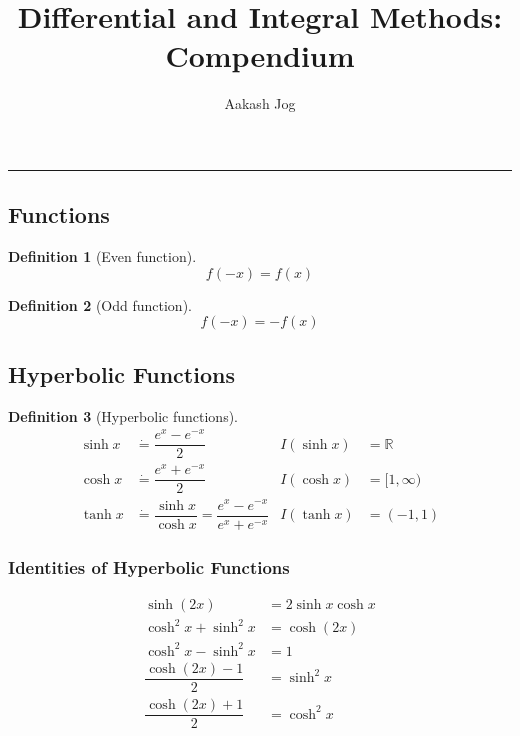 \documentclass[fleqn, a4paper, 10pt]{article}
\title{Differential and Integral Methods: Compendium}
\author{Aakash Jog}
\theoremstyle{definition}
\newtheorem{definition}{Definition}
\theoremstyle{theorem}
\theoremstyle{remark}
\begin{document}
	
\maketitle
\setlength{\mathindent}{0pt}

\tableofcontents

\vspace{1cm}
\hrule
\vspace{1cm}

\begin{multicols}{2}

\section{Functions}

\begin{definition}[Even function]
	\begin{equation*}
		f(-x) = f(x)
	\end{equation*}
\end{definition}

\begin{definition}[Odd function]
	\begin{equation*}
	f(-x) = -f(x)
	\end{equation*}
\end{definition}

\subsection{Hyperbolic Functions}

\begin{definition}[Hyperbolic functions]
	\begin{align*}
		\sinh x &\dot{=} \dfrac{e^x - e^{-x}}{2}
		& I(\sinh x) &= \mathbb{R}\\
		\cosh x &\dot{=} \dfrac{e^x + e^{-x}}{2}
		& I(\cosh x) &= [1, \infty)\\
		\tanh x &\dot{=} \dfrac{\sinh x}{\cosh x} = \dfrac{e^x - e^{-x}}{e^x + e^{-x}}
		& I(\tanh x) &= (-1, 1)
	\end{align*}
\end{definition}

\subsubsection{Identities of Hyperbolic Functions}

\begin{align*}
	\sinh (2x) &= 2 \sinh x \cosh x \\
	\cosh ^2 x + \sinh ^2 x &= \cosh (2x) \\
	\cosh ^2 x - \sinh ^2 x &= 1 \\
	\dfrac{\cosh (2x) - 1}{2} &= \sinh ^2 x \\
	\dfrac{\cosh (2x) + 1}{2} &= \cosh ^2 x 
\end{align*}


\end{multicols}
\end{document}
